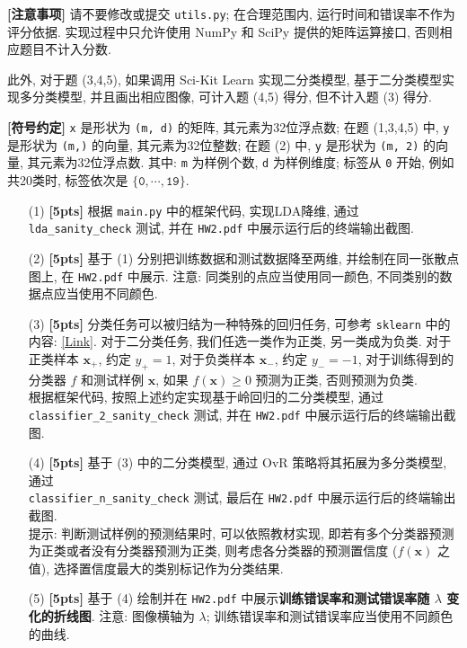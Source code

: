 \documentclass[a4paper]{article}
\numberwithin{equation}{section}
\theoremstyle{definition}
\def \x {\bm{x}}
\begin{document}
\begin{tcolorbox}
    \textbf{[注意事项]} 请不要修改或提交 \texttt{utils.py}; 在合理范围内, 运行时间和错误率不作为评分依据. 实现过程中只允许使用 NumPy 和 SciPy 提供的矩阵运算接口, 否则相应题目不计入分数.

    此外, 对于题 (3,4,5), 如果调用 Sci-Kit Learn 实现二分类模型, 基于二分类模型实现多分类模型, 并且画出相应图像, 可计入题 (4,5) 得分, 但不计入题 (3) 得分.

    \textbf{[符号约定]} \texttt{x} 是形状为 \texttt{(m, d)} 的矩阵, 其元素为32位浮点数; 在题 (1,3,4,5) 中, \texttt{y} 是形状为 \texttt{(m,)} 的向量, 其元素为32位整数; 在题 (2) 中, \texttt{y} 是形状为 \texttt{(m, 2)} 的向量, 其元素为32位浮点数. 其中: \texttt{m} 为样例个数, \texttt{d} 为样例维度; 标签从 \texttt{0} 开始, 例如共20类时, 标签依次是 $\{\mathtt{0}, \cdots, \mathtt{19}\}$.
\end{tcolorbox}

\begin{enumerate}
    \item[(1)] \textbf{[5pts]} 根据 \texttt{main.py} 中的框架代码, 实现LDA降维, 通过 \texttt{lda\_sanity\_check} 测试, 并在 \texttt{HW2.pdf} 中展示运行后的终端输出截图.
    \item[(2)] \textbf{[5pts]} 基于 (1) 分别把训练数据和测试数据降至两维, 并绘制在同一张散点图上, 在 \texttt{HW2.pdf} 中展示. 注意: 同类别的点应当使用同一颜色, 不同类别的数据点应当使用不同颜色.
    \item[(3)] \textbf{[5pts]} 分类任务可以被归结为一种特殊的回归任务, 可参考 \texttt{sklearn} 中的内容: \href{https://scikit-learn.org/stable/modules/linear_model.html#classification}{[Link]}. 对于二分类任务, 我们任选一类作为正类, 另一类成为负类. 对于正类样本 $\x_+$, 约定 $y_+ = 1$, 对于负类样本 $\x_-$, 约定 $y_- = -1$, 对于训练得到的分类器 $f$ 和测试样例 $\x$, 如果 $f(\x) \geqslant 0$ 预测为正类, 否则预测为负类. \\根据框架代码, 按照上述约定实现基于岭回归的二分类模型, 通过\\ \texttt{classifier\_2\_sanity\_check} 测试, 并在 \texttt{HW2.pdf} 中展示运行后的终端输出截图.
    \item[(4)] \textbf{[5pts]} 基于 (3) 中的二分类模型, 通过 OvR 策略将其拓展为多分类模型, 通过\\ \texttt{classifier\_n\_sanity\_check} 测试, 最后在 \texttt{HW2.pdf} 中展示运行后的终端输出截图.\\提示: 判断测试样例的预测结果时, 可以依照教材实现, 即若有多个分类器预测为正类或者没有分类器预测为正类, 则考虑各分类器的预测置信度 ($f(\x)$ 之值), 选择置信度最大的类别标记作为分类结果.
    \item[(5)] \textbf{[5pts]} 基于 (4) 绘制并在 \texttt{HW2.pdf} 中展示\textbf{训练错误率和测试错误率随 $\lambda$ 变化的折线图}. 注意: 图像横轴为 $\lambda$; 训练错误率和测试错误率应当使用不同颜色的曲线.
\end{enumerate}
\end{document}

